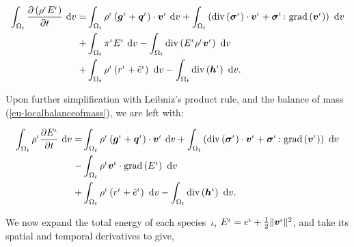 \begin{equation*}
\begin{split}
\int_{\Omega_{t}} \frac{\partial \left(\rho^{\iota}
  E^{\iota}\right)}{\partial t} \ \mathrm{d}v = & \int_{\Omega_{t}}
\rho^{\iota} \left(\mbox{\boldmath$ g$}^{\iota} +
\mbox{\boldmath$ q$}^{\iota}\right)\cdot\mbox{\boldmath$ v$}^{\iota}\ \mathrm{d}v + \int_{\Omega_{t}}
\left(\mathrm{div}\left(\mbox{\boldmath$\sigma$}^{\iota}\right)\cdot\mbox{\boldmath$ v$}^{\iota} +
\mbox{\boldmath$\sigma$}^{\iota}\colon\mathrm{grad}\left(\mbox{\boldmath$ v$}^{\iota}\right)
\right)\ \mathrm{d}v\\ + & \int_{\Omega_{t}}
\pi^{\iota}E^{\iota}\ \mathrm{d}v - \int_{\Omega_{t}}
\mathrm{div}\left(E^{\iota} \rho^{\iota}
\mbox{\boldmath$ v$}^{\iota}\right)\ \mathrm{d}v \\ + &\int_{\Omega_{t}} \rho^{\iota}
\left(r^{\iota} + \tilde{e}^{\iota} \right)\ \mathrm{d}v -
\int_{\Omega_{t}} \mathrm{div}\left(\mbox{\boldmath$ h$}^{\iota}\right)\ \mathrm{d}v.
\end{split}
\end{equation*}

\noindent Upon further simplification with Leibniz's product rule, and
the balance of mass (\ref{eu-localbalanceofmass}), we are left with:

\begin{equation*}
\begin{split}
\int_{\Omega_{t}} \rho^{\iota} \frac{\partial E^{\iota}}{\partial
  t}\ \mathrm{d}v = & \int_{\Omega_{t}} \rho^{\iota} \left(\mbox{\boldmath$ g$}^{\iota}
+ \mbox{\boldmath$ q$}^{\iota}\right)\cdot\mbox{\boldmath$ v$}^{\iota}\ \mathrm{d}v + \int_{\Omega_{t}}
\left(\mathrm{div}\left(\mbox{\boldmath$\sigma$}^{\iota}\right)\cdot\mbox{\boldmath$ v$}^{\iota} +
\mbox{\boldmath$\sigma$}^{\iota}\colon\mathrm{grad}\left(\mbox{\boldmath$ v$}^{\iota}\right)
\right)\ \mathrm{d}v\\ - & \int_{\Omega_{t}} \rho^{\iota}\mbox{\boldmath$ v$}^{\iota}
\cdot \mathrm{grad}\left( E^{\iota} \right)\ \mathrm{d}v \\ +
&\int_{\Omega_{t}} \rho^{\iota} \left(r^{\iota} + \tilde{e}^{\iota}
\right)\ \mathrm{d}v - \int_{\Omega_{t}}
\mathrm{div}\left(\mbox{\boldmath$ h$}^{\iota}\right)\ \mathrm{d}v.
\end{split}
\end{equation*}

We now expand the total energy of each species~$\iota$, $E^{\iota} =
e^\iota + \frac{1}{2} \Vert\mbox{\boldmath$ v$}^\iota\Vert^2$, and take its spatial and
temporal derivatives to give,

